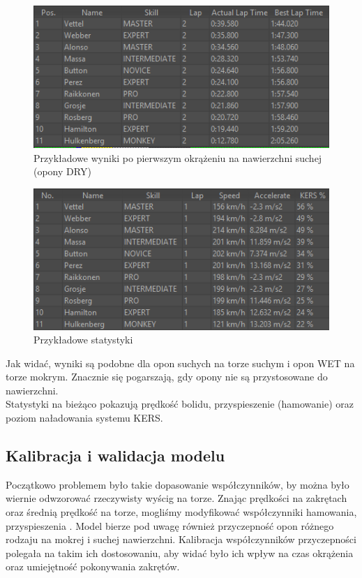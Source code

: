 \documentclass{article}
\begin{document}
\begin{figure}[h]
\begin{center}
\includegraphics[scale=0.8]{wetdry.png}
\caption{Przykładowe wyniki po pierwszym okrążeniu na nawierzchni suchej (opony DRY)}
\end{center}
\end{figure}

\begin{figure}[h]
\begin{center}
\includegraphics[scale=0.8]{stats.png}
\caption{Przykładowe statystyki}
\end{center}
\end{figure}

Jak widać, wyniki są podobne dla opon suchych na torze suchym i opon WET na torze mokrym. Znacznie się pogarszają, gdy opony nie są przystosowane do nawierzchni. \\

Statystyki na bieżąco pokazują prędkość bolidu, przyspieszenie (hamowanie) oraz poziom naładowania systemu KERS.

\subsection{Kalibracja i walidacja modelu}

Początkowo problemem było takie dopasowanie współczynników, by można było wiernie odwzorować rzeczywisty wyścig na torze. Znając prędkości na zakrętach oraz średnią prędkość na torze, mogliśmy modyfikować współczynniki hamowania, przyspieszenia \cite{track}. Model bierze pod uwagę również przyczepność opon różnego rodzaju na mokrej i suchej nawierzchni. Kalibracja współczynników przyczepności polegała na takim ich dostosowaniu, aby widać było ich wpływ na czas okrążenia oraz umiejętność pokonywania zakrętów. \\
\end{document}
